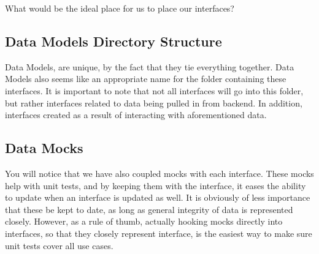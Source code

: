 What would be the ideal place for us to place our interfaces?

\subsection{Data Models Directory Structure}
Data Models, are unique, by the fact that they tie everything together. Data
Models also seems like an appropriate name for the folder containing these interfaces. It is important to note that not all interfaces will go into this folder, but rather interfaces related to data being pulled in from backend. In addition, interfaces created as a result of interacting with aforementioned
data.



\subsection{Data Mocks}
You will notice that we have also coupled mocks with each interface. These mocks
help with unit tests, and by keeping them with the interface, it eases the
ability to update when an interface is updated as well. It is obviously of less
importance that these be kept to date, as long as general integrity of data
is represented closely. However, as a rule of thumb, actually hooking mocks
directly into interfaces, so that they closely represent interface, is the
easiest way to make sure unit tests cover all use cases.
